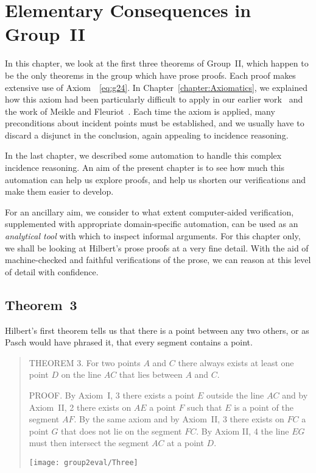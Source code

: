 \chapter{Elementary Consequences in Group~II}\label{chapter:Group2Eval}
In this chapter, we look at the first three theorems of Group~II, which happen to be the only theorems in the group which have prose proofs. Each proof makes extensive use of Axiom~~\ref{eq:g24}. In Chapter~\ref{chapter:Axiomatics}, we explained how this axiom had been particularly difficult to apply in our earlier work~\cite{ScottMScThesis} and the work of Meikle and Fleuriot~\cite{MeikleFleuriotFormalizingHilbert}. Each time the axiom is applied, many preconditions about incident points must be established, and we usually have to discard a disjunct in the conclusion, again appealing to incidence reasoning. 

In the last chapter, we described some automation to handle this complex incidence reasoning. An aim of the present chapter is to see how much this automation can help us explore proofs, and help us shorten our verifications and make them easier to develop. 

For an ancillary aim, we consider to what extent computer-aided verification, supplemented with appropriate domain-specific automation, can be used as an \emph{analytical tool} with which to inspect informal arguments. For this chapter only, we shall be looking at Hilbert's prose proofs at a very fine detail. With the aid of machine-checked and faithful verifications of the prose, we can reason at this level of detail with confidence.

\section{Theorem~3}\label{sec:Theorem3}
Hilbert's first theorem tells us that there is a point between any two others, or as Pasch would have phrased it, that every segment contains a point.

\begin{quotation}
THEOREM 3. For two points $A$ and $C$ there always exists at least one point $D$ on the line $AC$ that lies between $A$ and $C$.

PROOF. By Axiom~I, 3 there exists a point $E$ outside the line $AC$ and by Axiom~II, 2 there exists on $AE$ a point $F$ such that $E$ is a point of the segment $AF$. By the same axiom and by Axiom~II, 3 there exists on $FC$ a point $G$ that does not lie on the segment $FC$. By Axiom II, 4 the line $EG$ must then intersect the segment $AC$ at a point $D$.

\centering\texttt{[image: group2eval/Three]}
\end{quotation}

